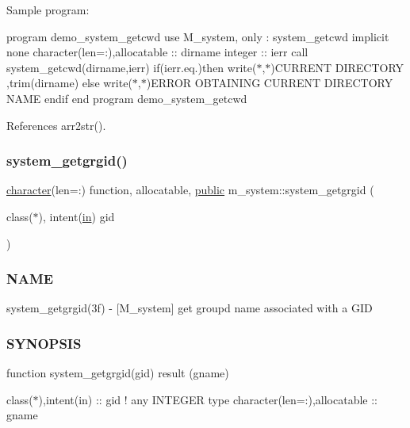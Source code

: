 Sample program\+:

program demo\+\_\+system\+\_\+getcwd use M\+\_\+system, only \+: system\+\_\+getcwd implicit none character(len=\+:),allocatable \+:\+: dirname integer \+:\+: ierr call system\+\_\+getcwd(dirname,ierr) if(ierr.\+eq.)then write($\ast$,$\ast$)\textquotesingle{}C\+U\+R\+R\+E\+NT D\+I\+R\+E\+C\+T\+O\+RY \textquotesingle{},trim(dirname) else write($\ast$,$\ast$)\textquotesingle{}E\+R\+R\+OR O\+B\+T\+A\+I\+N\+I\+NG C\+U\+R\+R\+E\+NT D\+I\+R\+E\+C\+T\+O\+RY N\+A\+ME\textquotesingle{} endif end program demo\+\_\+system\+\_\+getcwd 

References arr2str().

\mbox{\label{namespacem__system_aec137429fbb8c848db4ecd914466d7e8}} 
\subsubsection{\texorpdfstring{system\+\_\+getgrgid()}{system\_getgrgid()}}
{\footnotesize\ttfamily \hyperlink{option__stopwatch_83_8txt_abd4b21fbbd175834027b5224bfe97e66}{character}(len=\+:) function, allocatable, \hyperlink{M__stopwatch_83_8txt_a2f74811300c361e53b430611a7d1769f}{public} m\+\_\+system\+::system\+\_\+getgrgid (\begin{DoxyParamCaption}\item[{class($\ast$), intent(\hyperlink{M__journal_83_8txt_afce72651d1eed785a2132bee863b2f38}{in})}]{gid }\end{DoxyParamCaption})}



\subsubsection*{N\+A\+ME}

system\+\_\+getgrgid(3f) -\/ \mbox{[}M\+\_\+system\mbox{]} get groupd name associated with a G\+ID \subsubsection*{S\+Y\+N\+O\+P\+S\+IS}

function system\+\_\+getgrgid(gid) result (gname)

class($\ast$),intent(in) \+:\+: gid ! any I\+N\+T\+E\+G\+ER type character(len=\+:),allocatable \+:\+: gname

